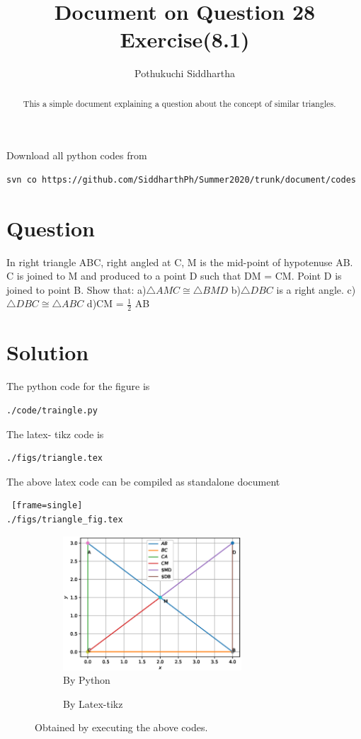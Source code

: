 \documentclass[journal,12pt,onecolumn]{IEEEtran}
\title{Document on Question 28 Exercise(8.1)}
\author{Pothukuchi Siddhartha}
\begin{document}
\maketitle
\begin{abstract}
This a simple document explaining a question about the concept of similar triangles.
\end{abstract}
Download all python codes from 
%
\begin{lstlisting}[frame= single]
svn co https://github.com/SiddharthPh/Summer2020/trunk/document/codes
\end{lstlisting}
%
\section*{\textbf{Question}}
In right triangle ABC, right angled at C, M is
the mid-point of hypotenuse AB. C is joined to
M and produced to a point D such that DM =
CM. Point D is joined to point B. Show that:
\newline
a)$\triangle  AMC  \cong   \triangle  BMD $
\newline
b)$\triangle DBC $ is a right angle.
\newline
c)$\triangle  DBC  \cong  \triangle  ABC $
\newline
d)CM = $\frac{1}{2}$ AB

\section*{\textbf{Solution}}
The python code for the figure is
\begin{lstlisting}[frame=single]
./code/traingle.py
\end{lstlisting}
The latex- tikz code is
\begin{lstlisting}[frame=single]
./figs/triangle.tex
\end{lstlisting}
The above latex code can be compiled as standalone document
\begin{lstlisting} [frame=single]
./figs/triangle_fig.tex
\end{lstlisting}
\begin{figure}[h]
\begin{subfigure}{0.5\textwidth}
\includegraphics[width=0.9\linewidth, height=5cm]{./figs/triangle.eps}
\caption{By Python}
\end{subfigure}
%
\begin{subfigure}{0.4\textwidth}
\begin{flushright}

\caption{By Latex-tikz}
\end{flushright}
\end{subfigure}
\caption{Obtained by executing the  above codes.}
\end{figure}
%
\end{document}
